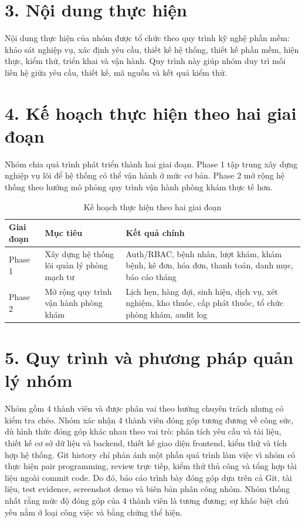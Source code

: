 \section*{3. Nội dung thực hiện}

Nội dung thực hiện của nhóm được tổ chức theo quy trình kỹ nghệ phần mềm: khảo sát nghiệp vụ, xác định yêu cầu, thiết kế hệ thống, thiết kế phần mềm, hiện thực, kiểm thử, triển khai và vận hành. Quy trình này giúp nhóm duy trì mối liên hệ giữa yêu cầu, thiết kế, mã nguồn và kết quả kiểm thử.


\section*{4. Kế hoạch thực hiện theo hai giai đoạn}

Nhóm chia quá trình phát triển thành hai giai đoạn. Phase 1 tập trung xây dựng nghiệp vụ lõi để hệ thống có thể vận hành ở mức cơ bản. Phase 2 mở rộng hệ thống theo hướng mô phỏng quy trình vận hành phòng khám thực tế hơn.

\begin{table}[H]
\centering
\caption{Kế hoạch thực hiện theo hai giai đoạn}
\begin{tabularx}{\textwidth}{|p{2.5cm}|X|X|}
\hline
\textbf{Giai đoạn} & \textbf{Mục tiêu} & \textbf{Kết quả chính} \\
\hline
Phase 1 & Xây dựng hệ thống lõi quản lý phòng mạch tư & Auth/RBAC, bệnh nhân, lượt khám, khám bệnh, kê đơn, hóa đơn, thanh toán, danh mục, báo cáo tháng \\
\hline
Phase 2 & Mở rộng quy trình vận hành phòng khám & Lịch hẹn, hàng đợi, sinh hiệu, dịch vụ, xét nghiệm, kho thuốc, cấp phát thuốc, tổ chức phòng khám, audit log \\
\hline
\end{tabularx}
\end{table}

\section*{5. Quy trình và phương pháp quản lý nhóm}

Nhóm gồm 4 thành viên và được phân vai theo hướng chuyên trách nhưng có kiểm tra chéo. Nhóm xác nhận 4 thành viên đóng góp tương đương về công sức, dù hình thức đóng góp khác nhau theo vai trò: phân tích yêu cầu và tài liệu, thiết kế cơ sở dữ liệu và backend, thiết kế giao diện frontend, kiểm thử và tích hợp hệ thống. Git history chỉ phản ánh một phần quá trình làm việc vì nhóm có thực hiện pair programming, review trực tiếp, kiểm thử thủ công và tổng hợp tài liệu ngoài commit code. Do đó, báo cáo trình bày đóng góp dựa trên cả Git, tài liệu, test evidence, screenshot demo và biên bản phân công nhóm. Nhóm thống nhất rằng mức độ đóng góp của 4 thành viên là tương đương; sự khác biệt chủ yếu nằm ở loại công việc và bằng chứng thể hiện.

